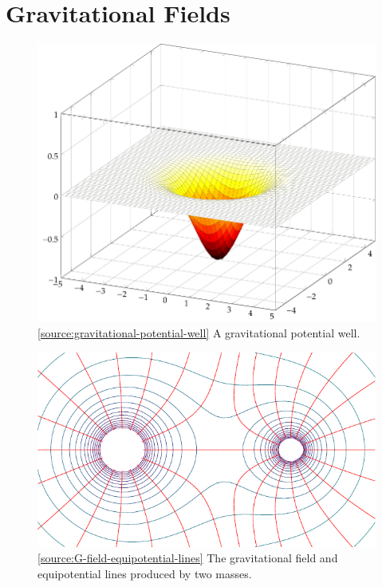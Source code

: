 \documentclass[oneside]{book}
\begin{document}
\chapter{Gravitational Fields}
\begin{figure}[H]
    \centering
    \includegraphics{../images/gravitational-potential-well/gravitational-potential-well-illustration.pdf}
    \caption{\ref{source:gravitational-potential-well} A gravitational potential well.}
    \label{fig:gravitational-potential-well}
\end{figure}
\begin{figure}[H]
    \centering
    \includegraphics[scale=1.1]{../images/Gravitational-fields-illustration.pdf}
    \caption{\ref{source:G-field-equipotential-lines} The gravitational field and equipotential lines produced by two masses.}
    \label{fig:G-field-equipotential-lines}
\end{figure}
\end{document}
